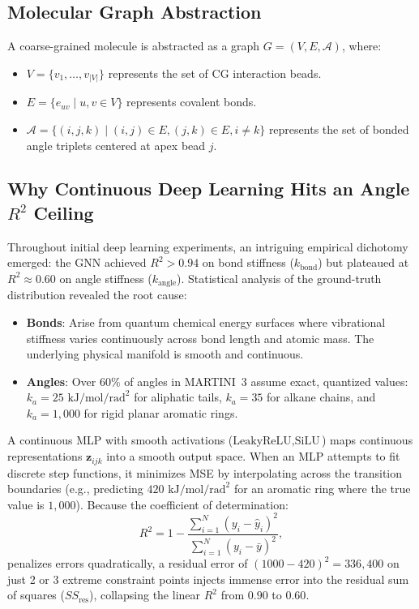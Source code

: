 \documentclass[11pt,a4paper]{article}
\begin{document}
\subsection{Molecular Graph Abstraction}
A coarse-grained molecule is abstracted as a graph $G = (V, E, \mathcal{A})$, where:
\begin{itemize}
    \item $V = \{v_1, \dots, v_{|V|}\}$ represents the set of CG interaction beads.
    \item $E = \{e_{uv} \mid u, v \in V\}$ represents covalent bonds.
    \item $\mathcal{A} = \{(i, j, k) \mid (i, j) \in E, (j, k) \in E, i \ne k\}$ represents the set of bonded angle triplets centered at apex bead $j$.
\end{itemize}

\subsection{Why Continuous Deep Learning Hits an Angle $R^2$ Ceiling}
Throughout initial deep learning experiments, an intriguing empirical dichotomy emerged: the GNN achieved $R^2 > 0.94$ on bond stiffness ($k_{\text{bond}}$) but plateaued at $R^2 \approx 0.60$ on angle stiffness ($k_{\text{angle}}$). Statistical analysis of the ground-truth distribution revealed the root cause:
\begin{itemize}
    \item \textbf{Bonds}: Arise from quantum chemical energy surfaces where vibrational stiffness varies continuously across bond length and atomic mass. The underlying physical manifold is smooth and continuous.
    \item \textbf{Angles}: Over $60\%$ of angles in MARTINI~3 assume exact, quantized values: $k_a = 25\text{ kJ/mol/rad}^2$ for aliphatic tails, $k_a = 35$ for alkane chains, and $k_a = 1{,}000$ for rigid planar aromatic rings.
\end{itemize}

A continuous MLP with smooth activations ($\text{LeakyReLU}, \text{SiLU}$) maps continuous representations $\mathbf{z}_{ijk}$ into a smooth output space. When an MLP attempts to fit discrete step functions, it minimizes MSE by interpolating across the transition boundaries (e.g., predicting $420\text{ kJ/mol/rad}^2$ for an aromatic ring where the true value is $1{,}000$). Because the coefficient of determination:
\begin{equation}
R^2 = 1 - \frac{\sum_{i=1}^N (y_i - \hat{y}_i)^2}{\sum_{i=1}^N (y_i - \bar{y})^2},
\end{equation}
penalizes errors quadratically, a residual error of $(1000 - 420)^2 = 336{,}400$ on just 2 or 3 extreme constraint points injects immense error into the residual sum of squares ($SS_{\text{res}}$), collapsing the linear $R^2$ from $0.90$ to $0.60$.
\end{document}

